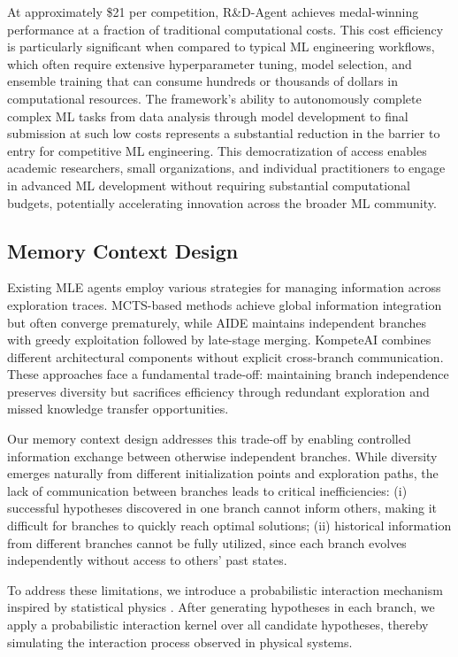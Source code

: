 At approximately \$21 per competition, R\&D-Agent achieves medal-winning performance at a fraction of traditional computational costs. This cost efficiency is particularly significant when compared to typical ML engineering workflows, which often require extensive hyperparameter tuning, model selection, and ensemble training that can consume hundreds or thousands of dollars in computational resources. The framework's ability to autonomously complete complex ML tasks from data analysis through model development to final submission at such low costs represents a substantial reduction in the barrier to entry for competitive ML engineering. This democratization of access enables academic researchers, small organizations, and individual practitioners to engage in advanced ML development without requiring substantial computational budgets, potentially accelerating innovation across the broader ML community.

\subsection{Memory Context Design}

Existing MLE agents employ various strategies for managing information across exploration traces. MCTS-based methods achieve global information integration but often converge prematurely, while AIDE maintains independent branches with greedy exploitation followed by late-stage merging. KompeteAI combines different architectural components without explicit cross-branch communication. These approaches face a fundamental trade-off: maintaining branch independence preserves diversity but sacrifices efficiency through redundant exploration and missed knowledge transfer opportunities.

Our memory context design addresses this trade-off by enabling controlled information exchange between otherwise independent branches. While diversity emerges naturally from different initialization points and exploration paths, the lack of communication between branches leads to critical inefficiencies: (i) successful hypotheses discovered in one branch cannot inform others, making it difficult for branches to quickly reach optimal solutions; (ii) historical information from different branches cannot be fully utilized, since each branch evolves independently without access to others' past states.

To address these limitations, we introduce a probabilistic interaction mechanism inspired by statistical physics \citep{isihara2013statistical}. After generating hypotheses in each branch, we apply a probabilistic interaction kernel over all candidate hypotheses, thereby simulating the interaction process observed in physical systems.

